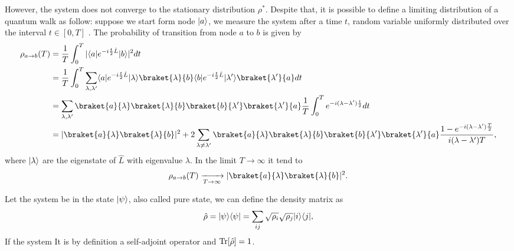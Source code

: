 However, the system does not converge to the stationary distribution $\rho^*$. 
Despite that, it is possible to define a limiting distribution of a quantum walk as follow: suppose we start form node $\lvert a\rangle$, we measure the system after a time $t$, random variable uniformly distributed over the interval $t \in [0,T]$ \cite{quantum_walk}. The probability of transition from node $a$ to $b$ is given by
\begin{equation}
    \begin{split}
        \rho_{a\rightarrow b}(T) &= \frac{1}{T}\int_0^T |\bra{a}e^{-i\frac{t}{2}\hat L} \ket{b}|^2 dt\\
        &=\frac{1}{T}\int_0^T \sum_{\lambda,\lambda'}\bra{a}e^{-i\frac{t}{2}\hat L}\ket{\lambda}\braket{\lambda}{b} \bra{b}e^{-i\frac{t}{2}\hat L} \ket{\lambda'}\braket{\lambda'}{a} dt\\
        &= \sum_{\lambda,\lambda'}\braket{a}{\lambda}\braket{\lambda}{b}\braket{b}{\lambda'}\braket{\lambda'}{a}\frac{1}{T}\int_0^T e^{-i(\lambda-\lambda')\frac{t}{2}}dt\\
        &= |\braket{a}{\lambda}\braket{\lambda}{b}|^2+2\sum_{\lambda\neq\lambda'}\braket{a}{\lambda}\braket{\lambda}{b}\braket{b}{\lambda'}\braket{\lambda'}{a}\frac{1-e^{-i(\lambda-\lambda')\frac{T}{2}}}{i(\lambda-\lambda')T},\\
    \end{split}
\end{equation}
where $\lvert\lambda\rangle$ are the eigenstate of $\hat L$ with eigenvalue $\lambda$. In the limit $T\rightarrow \infty$ it tend to 
\begin{equation}
    \rho_{a\rightarrow b}(T) \xrightarrow[T \rightarrow \infty]{} |\braket{a}{\lambda}\braket{\lambda}{b}|^2.
\end{equation}

Let the system be in the state $\lvert\psi\rangle$, also called pure state, we can define the density matrix as
\begin{equation}
    \hat\rho =\lvert\psi\rangle\langle\psi\rvert = \sum_{ij} \sqrt{\rho_i} \sqrt{\rho_j}\lvert i\rangle\langle j\rvert,
\end{equation}
If the system 
It is by definition a self-adjoint operator and $\operatorname{Tr}[\hat\rho] = 1$.

